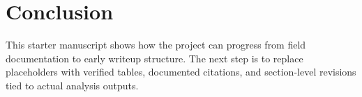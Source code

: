 \section{Conclusion}

This starter manuscript shows how the project can progress from field documentation to early writeup structure. The next step is to replace placeholders with verified tables, documented citations, and section-level revisions tied to actual analysis outputs.
